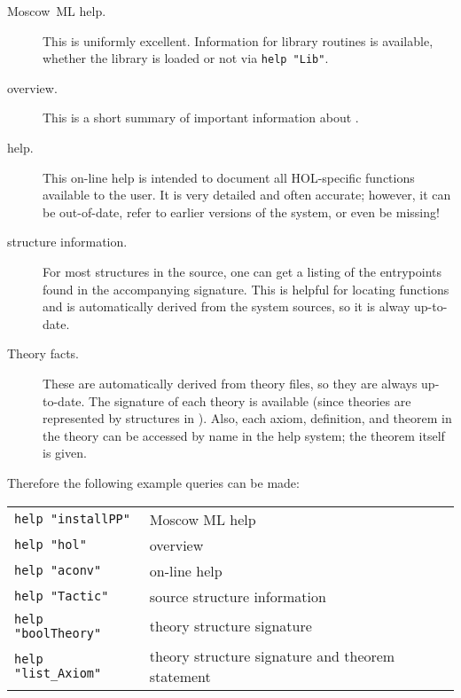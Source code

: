  \begin{description}

 \item [Moscow~ML help.] This is uniformly excellent. Information for
   library routines is available, whether the library is loaded or not
   via \verb+help "Lib"+.

\item [\HOL{} overview.] This is a short summary of important information
  about \HOL{}.

\item [\HOL{} help.] This on-line help is intended to document all
  HOL-specific functions available to the user. It is very detailed
  and often accurate; however, it can be out-of-date, refer to earlier
  versions of the system, or even be missing!

\item [\HOL{} structure information.]  For most structures in the
  \HOL{} source, one can get a listing of the entrypoints found in the
  accompanying signature. This is helpful for locating functions and
  is automatically derived from the system sources, so it is alway
  up-to-date.

\item [Theory facts.] These are automatically derived from theory
  files, so they are always up-to-date. The signature of each theory
  is available (since theories are represented by structures in
  \HOL{}). Also, each axiom, definition, and theorem in the theory can
  be accessed by name in the help system; the theorem itself is given.
\end{description}

Therefore the following example queries can be made:

\begin{table}[h]
  \begin{center}
    \begin{tabular}{|l|l|} \hline
      \verb+help "installPP"+ & Moscow ML help \\
      \verb+help "hol"+ &  \HOL{} overview \\
      \verb+help "aconv"+ &  on-line \HOL{} help \\
      \verb+help "Tactic"+ & \HOL{} source structure information \\
      \verb+help "boolTheory"+ &  theory structure signature \\
      \verb+help "list_Axiom"+ & theory structure signature and theorem
      statement \\ \hline
    \end{tabular}
  \end{center}
\end{table}

